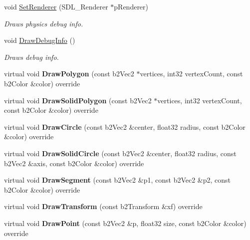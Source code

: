 \begin{DoxyCompactItemize}
\mbox{\label{class_physics_system_a294106832fdfe2bc30878a7ed6380fb0}} 
void \mbox{\hyperlink{class_physics_system_a294106832fdfe2bc30878a7ed6380fb0}{Set\+Renderer}} (S\+D\+L\+\_\+\+Renderer $\ast$p\+Renderer)
\begin{DoxyCompactList}\small\item\em Draws physics debug info. \end{DoxyCompactList}\item 
\mbox{\label{class_physics_system_a9d09acb7309a9bd0c1527ab8b5e39469}} 
void \mbox{\hyperlink{class_physics_system_a9d09acb7309a9bd0c1527ab8b5e39469}{Draw\+Debug\+Info}} ()
\begin{DoxyCompactList}\small\item\em Draws debug info. \end{DoxyCompactList}\item 
\mbox{\label{class_physics_system_a3ee533540e81eac532453c4c02c8749a}} 
virtual void {\bfseries Draw\+Polygon} (const b2\+Vec2 $\ast$vertices, int32 vertex\+Count, const b2\+Color \&color) override
\item 
\mbox{\label{class_physics_system_a61db3554729697a2023e297d28c7b958}} 
virtual void {\bfseries Draw\+Solid\+Polygon} (const b2\+Vec2 $\ast$vertices, int32 vertex\+Count, const b2\+Color \&color) override
\item 
\mbox{\label{class_physics_system_a1c653117bcff772a3d9dc1462c081fc7}} 
virtual void {\bfseries Draw\+Circle} (const b2\+Vec2 \&center, float32 radius, const b2\+Color \&color) override
\item 
\mbox{\label{class_physics_system_a6e17da4cb6c33eabee1a4f9276a71598}} 
virtual void {\bfseries Draw\+Solid\+Circle} (const b2\+Vec2 \&center, float32 radius, const b2\+Vec2 \&axis, const b2\+Color \&color) override
\item 
\mbox{\label{class_physics_system_a65d8bb17d93f22cbf0bc54d62dc94ed0}} 
virtual void {\bfseries Draw\+Segment} (const b2\+Vec2 \&p1, const b2\+Vec2 \&p2, const b2\+Color \&color) override
\item 
\mbox{\label{class_physics_system_a5b3cecb4fb81082cb4cf14fc21d91d06}} 
virtual void {\bfseries Draw\+Transform} (const b2\+Transform \&xf) override
\item 
\mbox{\label{class_physics_system_a44da913dfdad57c721c2b6330b485081}} 
virtual void {\bfseries Draw\+Point} (const b2\+Vec2 \&p, float32 size, const b2\+Color \&color) override
\end{DoxyCompactItemize}
